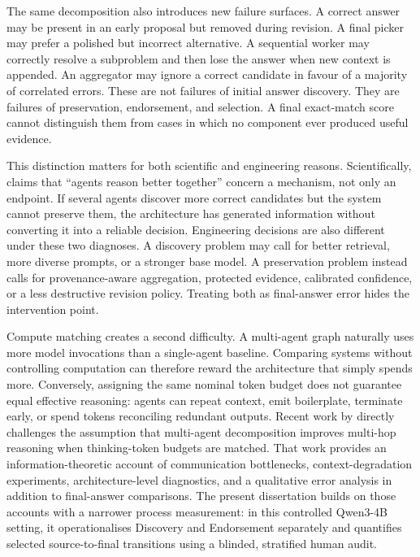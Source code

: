 The same decomposition also introduces new failure surfaces. A correct answer may be present in an early proposal but removed during revision. A final picker may prefer a polished but incorrect alternative. A sequential worker may correctly resolve a subproblem and then lose the answer when new context is appended. An aggregator may ignore a correct candidate in favour of a majority of correlated errors. These are not failures of initial answer discovery. They are failures of preservation, endorsement, and selection. A final exact-match score cannot distinguish them from cases in which no component ever produced useful evidence.

This distinction matters for both scientific and engineering reasons. Scientifically, claims that ``agents reason better together'' concern a mechanism, not only an endpoint. If several agents discover more correct candidates but the system cannot preserve them, the architecture has generated information without converting it into a reliable decision. Engineering decisions are also different under these two diagnoses. A discovery problem may call for better retrieval, more diverse prompts, or a stronger base model. A preservation problem instead calls for provenance-aware aggregation, protected evidence, calibrated confidence, or a less destructive revision policy. Treating both as final-answer error hides the intervention point.

Compute matching creates a second difficulty. A multi-agent graph naturally uses more model invocations than a single-agent baseline. Comparing systems without controlling computation can therefore reward the architecture that simply spends more. Conversely, assigning the same nominal token budget does not guarantee equal effective reasoning: agents can repeat context, emit boilerplate, terminate early, or spend tokens reconciling redundant outputs. Recent work by \citet{tran2026single} directly challenges the assumption that multi-agent decomposition improves multi-hop reasoning when thinking-token budgets are matched. That work provides an information-theoretic account of communication bottlenecks, context-degradation experiments, architecture-level diagnostics, and a qualitative error analysis in addition to final-answer comparisons. The present dissertation builds on those accounts with a narrower process measurement: in this controlled Qwen3-4B setting, it operationalises Discovery and Endorsement separately and quantifies selected source-to-final transitions using a blinded, stratified human audit.

